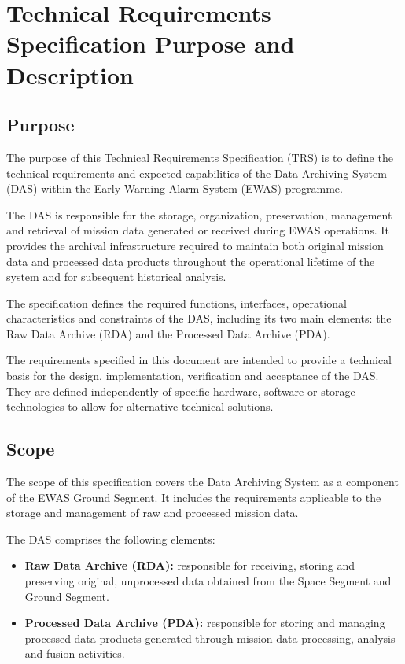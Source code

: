 \section{Technical Requirements Specification Purpose and Description}

\subsection{Purpose}

The purpose of this Technical Requirements Specification (TRS) is to define the technical requirements and expected capabilities of the Data Archiving System (DAS) within the Early Warning Alarm System (EWAS) programme.

The DAS is responsible for the storage, organization, preservation, management and retrieval of mission data generated or received during EWAS operations. It provides the archival infrastructure required to maintain both original mission data and processed data products throughout the operational lifetime of the system and for subsequent historical analysis.

The specification defines the required functions, interfaces, operational characteristics and constraints of the DAS, including its two main elements: the Raw Data Archive (RDA) and the Processed Data Archive (PDA).

The requirements specified in this document are intended to provide a technical basis for the design, implementation, verification and acceptance of the DAS. They are defined independently of specific hardware, software or storage technologies to allow for alternative technical solutions.

\subsection{Scope}

The scope of this specification covers the Data Archiving System as a component of the EWAS Ground Segment. It includes the requirements applicable to the storage and management of raw and processed mission data.

The DAS comprises the following elements:

\begin{itemize}
    \item \textbf{Raw Data Archive (RDA):} responsible for receiving, storing and preserving original, unprocessed data obtained from the Space Segment and Ground Segment.
    \item \textbf{Processed Data Archive (PDA):} responsible for storing and managing processed data products generated through mission data processing, analysis and fusion activities.
\end{itemize}

